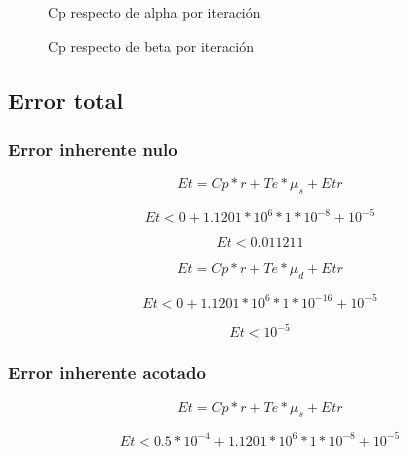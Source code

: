 \documentclass[11pt,a4paper]{article}
\begin{document}
\begin{figure}[H]
	\caption{Cp respecto de alpha por iteración}
	\label{fig:cpsa}
\end{figure}

\begin{figure}[H]
	\caption{Cp respecto de beta por iteración}
	\label{fig:cpsb}
\end{figure}

\subsection{Error total}

\subsubsection{Error inherente nulo}

\begin{equation}
\label{errortotal}
 Et = Cp * r + Te * \mu_s + Etr 
\end{equation}

\begin{equation}
 Et < 0 + 1.1201*10^6 * 1*10^{-8} + 10^{-5}
\end{equation}

\begin{equation}
 Et < 0.011211
\end{equation}

\begin{equation}
  Et = Cp * r + Te * \mu_d + Etr 
\end{equation}

\begin{equation}
    Et < 0 + 1.1201*10^6 * 1*10^{-16} + 10^{-5}
\end{equation}

\begin{equation}
    Et < 10^{-5}
\end{equation}
  
\subsubsection{Error inherente acotado}

\begin{equation}
    Et = Cp * r + Te * \mu_s + Etr
\end{equation}

\begin{equation}
  Et < 0.5*10^{-4} + 1.1201*10^6 * 1*10^{-8} + 10^{-5}
\end{equation}
\end{document}
